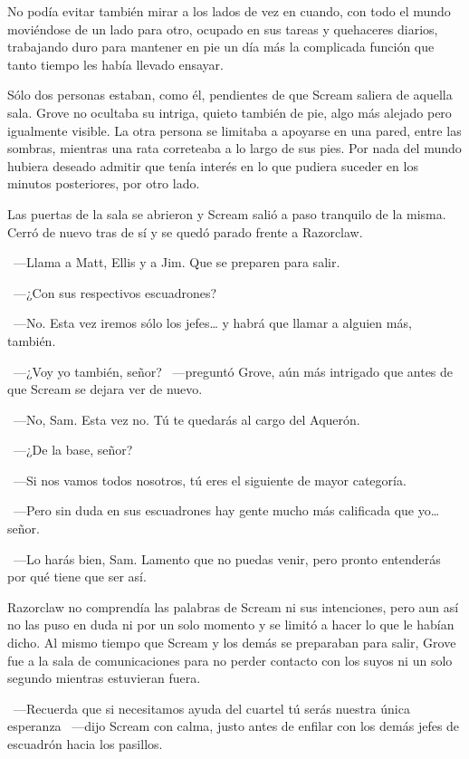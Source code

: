 No podía evitar también mirar a los lados de vez en cuando, con todo el mundo moviéndose de un lado para otro, ocupado en sus tareas y quehaceres diarios, trabajando duro para mantener en pie un día más la complicada función que tanto tiempo les había llevado ensayar.

Sólo dos personas estaban, como él, pendientes de que Scream saliera de aquella sala. Grove no ocultaba su intriga, quieto también de pie, algo más alejado pero igualmente visible. La otra persona se limitaba a apoyarse en una pared, entre las sombras, mientras una rata correteaba a lo largo de sus pies. Por nada del mundo hubiera deseado admitir que tenía interés en lo que pudiera suceder en los minutos posteriores, por otro lado.

Las puertas de la sala se abrieron y Scream salió a paso tranquilo de la misma. Cerró de nuevo tras de sí y se quedó parado frente a Razorclaw.

~---Llama a Matt, Ellis y a Jim. Que se preparen para salir.

~---¿Con sus respectivos escuadrones?

~---No. Esta vez iremos sólo los jefes… y habrá que llamar a alguien más, también.

~---¿Voy yo también, señor? ~---preguntó Grove, aún más intrigado que antes de que Scream se dejara ver de nuevo.

~---No, Sam. Esta vez no. Tú te quedarás al cargo del Aquerón.

~---¿De la base, señor?

~---Si nos vamos todos nosotros, tú eres el siguiente de mayor categoría.

~---Pero sin duda en sus escuadrones hay gente mucho más calificada que yo… señor.

~---Lo harás bien, Sam. Lamento que no puedas venir, pero pronto entenderás por qué tiene que ser así.

Razorclaw no comprendía las palabras de Scream ni sus intenciones, pero aun así no las puso en duda ni por un solo momento y se limitó a hacer lo que le habían dicho. Al mismo tiempo que Scream y los demás se preparaban para salir, Grove fue a la sala de comunicaciones para no perder contacto con los suyos ni un solo segundo mientras estuvieran fuera.

~---Recuerda que si necesitamos ayuda del cuartel tú serás nuestra única esperanza ~---dijo Scream con calma, justo antes de enfilar con los demás jefes de escuadrón hacia los pasillos.

